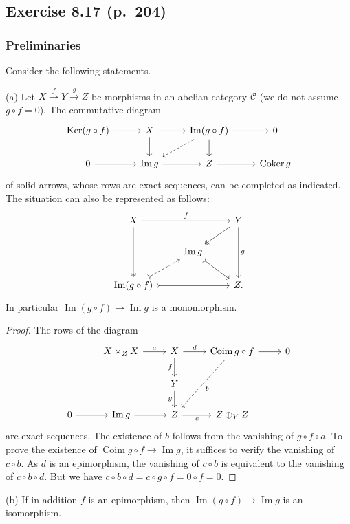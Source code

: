 \documentclass[12pt]{article}%
\theoremstyle{remark}
\theoremstyle{definition}
\newcommand{\nn}{\noindent}
\newcommand{\C}{\mathcal C}
\newcommand{\xr}{\xrightarrow}
\DeclareMathOperator{\Coim}{Coim}
\DeclareMathOperator{\Coker}{Coker}
\DeclareMathOperator{\Ima}{Im}
\DeclareMathOperator{\Ker}{Ker}
\begin{document}

\subsection{Exercise 8.17 (p.~204)}\label{817} 

\subsubsection{Preliminaries}\label{preli}

Consider the following statements.

\nn(a) Let $X\xr fY\xr gZ$ be morphisms in an abelian category $\C$ (we do not assume $g\circ f=0$). The commutative diagram 
$$
\begin{tikzcd}
\Ker(g\circ f)\ar{r}&X\ar{d}\ar{r}&\Ima(g\circ f)\ar[dashed]{dl}\ar{d}\ar{r}&0\\ 
0\ar{r}&\Ima g\ar{r}&Z\ar{r}&\Coker g
\end{tikzcd}
$$ 
of solid arrows, whose rows are exact sequences, can be completed as indicated. The situation can also be represented as follows: 
$$
\begin{tikzcd}
X\ar[two heads]{dd}\ar{rr}{f}&&Y\ar[two heads]{dl}\ar{dd}{g}\\ 
{}&\Ima g\ar[tail]{dr}\\ 
\Ima(g\circ f)\ar[dashed,tail]{ur}\ar[tail]{rr}&&Z.
\end{tikzcd}
$$ 
In particular $\Ima(g\circ f)\to\Ima g$ is a monomorphism. 

\begin{proof} 
The rows of the diagram 
$$
\begin{tikzcd}
{}&X\times_ZX\ar{r}{a}&X\ar{d}[swap]{f}\ar{r}{d}&\Coim g\circ f\ar{r}\ar[dashed]{ddl}{b}&0\\ 
{}&{}&Y\ar{d}[swap]{g}\\
0\ar{r}&\Ima g\ar{r}&Z\ar{r}[swap]{c}&Z\oplus_YZ
\end{tikzcd}
$$ 
are exact sequences. The existence of $b$ follows from the vanishing of $g\circ f\circ a$. To prove the existence of $\Coim g\circ f\to\Ima g$, it suffices to verify the vanishing of $c\circ b$. As $d$ is an epimorphism, the vanishing of $c\circ b$ is equivalent to the vanishing of $c\circ b\circ d$. But we have $c\circ b\circ d=c\circ g\circ f=0\circ f=0$. 
\end{proof} 

\nn(b) If in addition $f$ is an epimorphism, then $\Ima(g\circ f)\to\Ima g$ is an isomorphism. 
\end{document}
